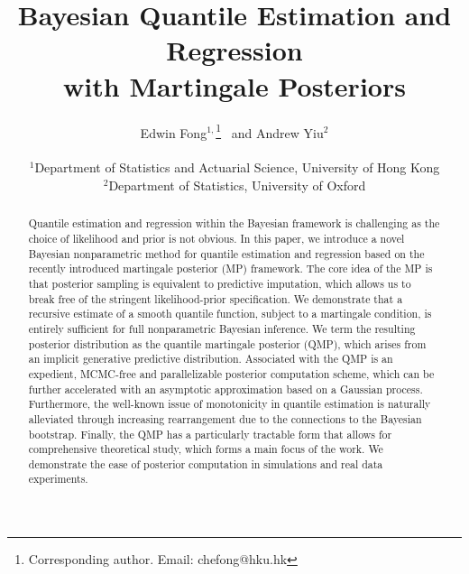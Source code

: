 \documentclass[11pt,a4paper]{article}
\begin{document}
\title{Bayesian Quantile Estimation and Regression\\ with Martingale Posteriors}


\author{Edwin Fong$^{1,}$\thanks{Corresponding author. Email: chefong@hku.hk} \ and Andrew Yiu$^{2}$  \\ \\
$^1$Department of Statistics and Actuarial Science, University of Hong Kong\\
$^2$Department of Statistics, University of Oxford\\
}
\date{}

\maketitle
\vspace{-5mm}
\begin{abstract}
Quantile estimation and regression within the Bayesian framework is challenging as the choice of likelihood and prior is not obvious. 
In this paper, we introduce a novel Bayesian nonparametric method for quantile estimation and regression based on the recently introduced martingale posterior (MP) framework. The core idea of the MP is that posterior sampling is equivalent to predictive imputation, which allows us to break free of the stringent likelihood-prior specification. We  demonstrate that a recursive estimate of a smooth quantile function, subject to a martingale condition, is entirely sufficient for full nonparametric Bayesian inference. We term the resulting posterior distribution as the quantile martingale posterior (QMP), which arises from an implicit generative predictive distribution. Associated with the QMP is an expedient, MCMC-free and parallelizable posterior computation scheme, which can be further accelerated with an asymptotic approximation based on a Gaussian process. Furthermore, the well-known issue of monotonicity in quantile estimation is naturally alleviated through increasing rearrangement due to the connections to the Bayesian bootstrap.  Finally, the QMP has a particularly tractable form that allows for comprehensive theoretical study, which forms a main focus of the work. We demonstrate the ease of posterior computation in simulations and real data experiments. 
\end{abstract}
\end{document}
